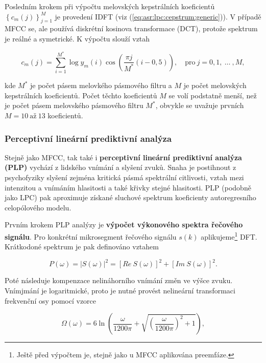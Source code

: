 Posledním krokem při výpočtu melovských kepstrálních koeficientů $\left\{c_m\left(j\right)\right\}_{j=1}^{M}$ je provedení IDFT (viz (\ref{eq:asr:lpc:cepstrum:generic})). V případě MFCC se, ale používá diskrétní kosinova transformace (DCT), protože spektrum je reálné a symetrické. K výpočtu slouží vztah

\begin{equation}
  c_{m}(j) = \sum_{i=1}^{M^{*}} \log y_m(i) \cos\left( \frac{\pi j}{M^{*}}\left(i - 0,5\right) \right),  \quad \text{pro}\ j = 0, 1,\ \dots\ ,M,
  \label{eq:asr:mfcc:coef}
\end{equation}

\noindent kde $M^{*}$ je počet pásem melovkého pásmového filtru a $M$ je počet melovských kepstrálních koeficientů. Počet těchto koeficientů $M$ se volí podstatně menší, než je počet pásem melovského pásmového filtru $M^{*}$, obvykle se uvažuje prvních $M = 10\ \text{až}\ 13$ koeficientů.

\subsubsection{Perceptivní lineární prediktivní analýza}

Stejně jako MFCC, tak také i \textbf{perceptivní lineární prediktivní analýza (PLP)} vychází z lidského vnímání a slyšení zvuků. Snaha je postihnout z psychofyziky slyšení zejména kritická pásmá spektrální citlivosti, vztah mezi intenzitou a vnímáním hlasitosti a také křivky stejné hlasitosti. \cite{Psutka2006} PLP (podobně jako LPC) pak aproximuje získané sluchové spektrum koeficienty autoregresního celopólového modelu.

Prvním krokem PLP analýzy je \textbf{výpočet výkonového spektra řečového signálu}. Pro konkrétní mikrosegment řečového signálu $s(k)$ aplikujeme\footnote{Ještě před výpočtem je, stejně jako u MFCC aplikována preemfáze.} DFT. Krátkodoné spektrum je pak definováno vztahem

\begin{equation}
  P\left(\omega\right) = \left| S\left(\omega\right) \right|^{2} = \left[Re\ S\left(\omega\right)\right]^2 + \left[Im\ S\left( \omega \right) \right]^2.
  \label{eq:asr:plp:spectr}
\end{equation}

\noindent Poté následuje kompenzace nelináhorního vnímání změn ve výšce zvuku. Vnímjmání je logaritmické, proto je nutné provést nelineární transformaci frekvenční osy pomocí vzorce

\begin{equation}
  \Omega\left(\omega\right) = 6 \ln \left( \frac{\omega}{1200\pi} + \sqrt{\left(\frac{\omega}{1200\pi}\right)^2 + 1} \right),
  \label{eq:asr:plp:transform}
\end{equation}

